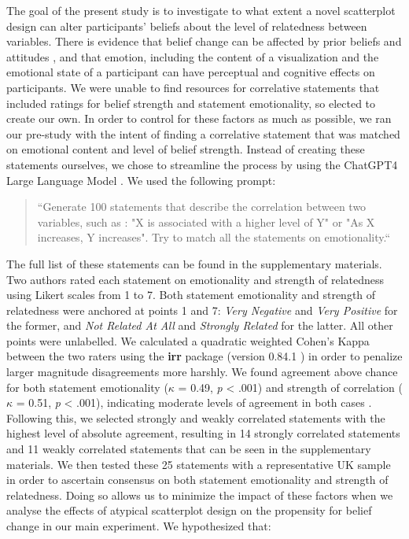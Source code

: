 \documentclass[manuscript,screen,review,anonymous]{acmart}
\begin{document}
The goal of the present study is to investigate to what extent a novel
scatterplot design can alter participants' beliefs about the level of
relatedness between variables. There is evidence that belief change can
be affected by prior beliefs and attitudes
\citep{xiong_2022, markant_2023}, and that emotion, including the
content of a visualization \citep{phelps_2006, harrison_2013} and the
emotional state of a participant \citep{thoresen_2016} can have
perceptual and cognitive effects on participants. We were unable to find
resources for correlative statements that included ratings for belief
strength and statement emotionality, so elected to create our own. In
order to control for these factors as much as possible, we ran our
pre-study with the intent of finding a correlative statement that was
matched on emotional content and level of belief strength. Instead of
creating these statements ourselves, we chose to streamline the process
by using the ChatGPT4 Large Language Model \citep{chat_gpt}. We used the
following prompt:

\begin{quotation}
    ``Generate 100 statements that describe the correlation between two variables, such as :
     "X is associated with a higher level of Y" or
     "As X increases, Y increases".
    Try to match all the statements on emotionality.``
    
\end{quotation}

The full list of these statements can be found in the supplementary
materials. Two authors rated each statement on emotionality and strength
of relatedness using Likert scales from 1 to 7. Both statement
emotionality and strength of relatedness were anchored at points 1 and
7: \emph{Very Negative} and \emph{Very Positive} for the former, and
\emph{Not Related At All} and \emph{Strongly Related} for the latter.
All other points were unlabelled. We calculated a quadratic weighted
Cohen's Kappa between the two raters using the \textbf{irr} package
(version 0.84.1 \citep{irr}) in order to penalize larger magnitude
disagreements more harshly. We found agreement above chance for both
statement emotionality (\(\kappa\) = 0.49, \emph{p} \textless{} .001)
and strength of correlation (\(\kappa\) = 0.51, \emph{p} \textless{}
.001), indicating moderate levels of agreement in both cases
\citep{cohen_1968, fleiss_1969}. Following this, we selected strongly
and weakly correlated statements with the highest level of absolute
agreement, resulting in 14 strongly correlated statements and 11 weakly
correlated statements that can be seen in the supplementary materials.
We then tested these 25 statements with a representative UK sample in
order to ascertain consensus on both statement emotionality and strength
of relatedness. Doing so allows us to minimize the impact of these
factors when we analyse the effects of atypical scatterplot design on
the propensity for belief change in our main experiment. We hypothesized
that:
\end{document}
